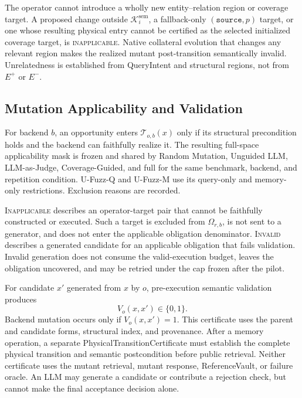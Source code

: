 The operator cannot introduce a wholly new entity--relation region or coverage
target. A proposed change outside \(\mathcal{K}^{\mathrm{sem}}_i\), a
fallback-only \((\texttt{source},p)\) target, or one whose resulting physical
entry cannot be certified as the selected initialized coverage target, is
\textsc{inapplicable}. Native collateral evolution that changes any relevant
region makes the realized mutant post-transition semantically invalid.
Unrelatedness is established from QueryIntent and structural regions, not from
\(E^{+}\) or \(E^{-}\).

\subsection{Mutation Applicability and Validation}
\label{app:mutation-validation}

For backend \(b\), an opportunity enters
\(\mathcal{T}_{o,b}(x)\) only if its structural precondition holds and the
backend can faithfully realize it. The resulting full-space applicability mask
is frozen and shared by Random Mutation, Unguided LLM, LLM-as-Judge,
Coverage-Guided, and full \system for the same benchmark, backend, and
repetition condition. U-Fuzz-Q and U-Fuzz-M use its query-only and memory-only
restrictions. Exclusion reasons are recorded.

\textsc{Inapplicable} describes an operator-target pair that cannot be
faithfully constructed or executed. Such a target is excluded from
\(\Omega_{r,b}\), is not sent to a generator, and does not enter the applicable
obligation denominator. \textsc{Invalid} describes a generated candidate for
an applicable obligation that fails validation. Invalid generation does not
consume the valid-execution budget, leaves the obligation uncovered, and may
be retried under the cap frozen after the pilot.

For candidate \(x'\) generated from \(x\) by \(o\), pre-execution semantic
validation produces
\[
V_o(x,x')\in\{0,1\}.
\]
Backend mutation occurs only if \(V_o(x,x')=1\). This certificate uses the
parent and candidate forms, structural index, and provenance. After a memory
operation, a separate PhysicalTransitionCertificate must establish the
complete physical transition and semantic postcondition before public
retrieval. Neither certificate uses the mutant retrieval, mutant response,
ReferenceVault, or failure oracle. An LLM may generate a candidate or
contribute a rejection check, but cannot make the final acceptance decision
alone.


